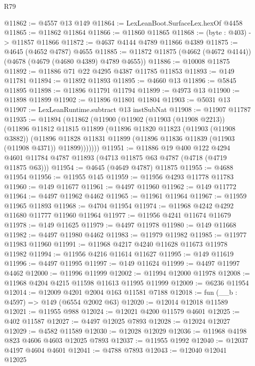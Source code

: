 \begin{lexlean}{R79}
\begin{coremodule}
@11862 := @4557 @13 @149
@11864 := LexLeanBoot.SurfaceLex.hexOf @4458
@11865 := @11862 @11864
@11866 := @11860 @11865
@11868 := (byte : @403) -> @11857 @11866
@11872 := @4637 @4144 @4789 @11866 @4389
@11875 := @4645 (@4652 @4787) @4655
@11885 := @11872 @11875 (@4662 (@4672 @4144)) (@4678 (@4679 (@4680 @4389) @4789 @4655))
@11886 := @10008 @11875
@11892 := @11886 @71 @22 @4295 @4387 @11785 @11853
@11893 := @149 @11781
@11894 := @11892 @11893
@11895 := @4660 @13
@11896 := @5845 @11895
@11898 := @11896 @11791 @11794
@11899 := @4973 @13
@11900 := @11898 @11899
@11902 := @11896 @11801 @11804
@11903 := @5031 @13
@11907 := LexLeanRuntime.subtract @13 instSubNat
@11908 := @11907 @11787
@11935 := @11894
    (@11862
      (@11900
        (@11902
          (@11903 (@11908 @2213))
          (@11896
            @11812
            @11815
            @11899
            (@11896
              @11820
              @11823
              (@11903 (@11908 @3882))
              (@11896
                @11828
                @11831
                @11899
                (@11896 @11836 @11839 (@11903 (@11908 @4371)) @11899)))))))
@11951 := @11886
    @19
    @400
    @122
    @4294
    @4601
    @11784
    @4787
    @11893
    (@4713 @11875 @63 @4787 (@4718 (@4719 @11875 @63)))
@11954 := @4645 (@4649 @4787) @11875
@11955 := @4688 @11954
@11956 := @11955 @145
@11959 := @11956 @4293 @11778 @11783
@11960 := @149 @11677
@11961 := @4497 @11960
@11962 := @149 @11772
@11964 := @4497 @11962 @4462
@11965 := @11961 @11964
@11967 := @11959 @11965 @11893
@11968 := @4704 @11954
@11974 := @11968 @4242 @4292 @11680 @11777 @11960 @11964
@11977 := @11956 @4241 @11674 @11679
@11978 := @149 @11625
@11979 := @4497 @11978
@11980 := @149 @11668
@11982 := @4497 @11980 @4462
@11983 := @11979 @11982
@11985 := @11977 @11983 @11960
@11991 := @11968 @4217 @4240 @11628 @11673 @11978 @11982
@11994 := @11956 @4216 @11614 @11627
@11995 := @149 @11619
@11996 := @4497 @11995
@11997 := @149 @11624
@11999 := @4497 @11997 @4462
@12000 := @11996 @11999
@12002 := @11994 @12000 @11978
@12008 := @11968 @4204 @4215 @11598 @11613 @11995 @11999
@12009 := @6236 @11954
@12014 := @12009 @4201 @2004 @163 @11581 @7188
@12018 := fun (__b : @4597) => @149 (@6554 @2002 @63)
@12020 := @12014 @12018 @11589
@12021 := @11955 @988
@12024 := @12021 @4200 @11579 @4601
@12025 := @402 @11587
@12027 := @4497 @12025 @7893
@12028 := @12024 @12027
@12029 := @4582 @11589
@12030 := @12028 @12029
@12036 := @11968 @4198 @823 @4606 @4603 @12025 @7893
@12037 := @11955 @1992
@12040 := @12037 @4197 @4604 @4601
@12041 := @4788 @7893
@12043 := @12040 @12041 @12025

\end{coremodule}
\end{lexlean}
